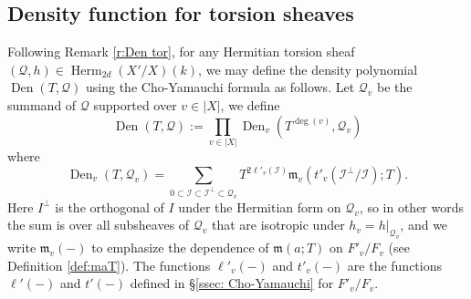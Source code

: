\documentclass[reqno]{amsart}
\numberwithin{equation}{section}
\DeclareMathOperator{\Herm}{Herm}
\DeclareMathOperator{\Den}{Den}
\newcommand\op{\oplus}
\newcommand\cI{\mathcal{I}}
\newcommand\cQ{\mathcal{Q}}
\newcommand\fm{\mathfrak{m}}
\theoremstyle{remark}
\numberwithin{equation}{section}
\begin{document}
%




\subsection{Density function for torsion sheaves}\label{ssec: density function for torsion sheaves}

Following Remark \ref{r:Den tor}, for any Hermitian torsion sheaf $(\cQ,h)\in \Herm_{2d}(X'/X)(k)$, we may define the density  polynomial $\Den(T,\cQ)$ using the Cho-Yamauchi formula as follows. Let $\cQ_{v}$ be the summand of $\cQ$ supported over $v\in |X|$, we define
\begin{equation*}
\Den(T,\cQ):=\prod_{v\in|X|}\Den_{v}(T^{\deg(v)}, \cQ_{v})
\end{equation*}
where
\begin{equation*}
\Den_{v}(T, \cQ_{v})=\sum_{0\subset\cI\subset \cI^{\bot}\subset \cQ_{v}} T^{2\ell'_{v}(\cI)}\fm_{v}(t'_{v}(\cI^{\bot}/\cI);T). 
\end{equation*}
Here $I^\perp$ is the orthogonal of $I$ under the Hermitian form on $\cQ_v$, so in other words the sum is over all subsheaves of $\cQ_{v}$ that are isotropic under $h_{v}=h|_{\cQ_{v}}$, and we write $\fm_{v}(-)$ to emphasize the dependence of $\fm(a;T)$ on $F'_{v}/F_{v}$ (see Definition \ref{def:maT}). The functions $\ell'_{v}(-)$ and $t'_{v}(-)$ are the functions $\ell'(-)$ and $t'(-)$ defined in \S \ref{ssec: Cho-Yamauchi} for $F'_{v}/F_{v}$. 
\end{document}
